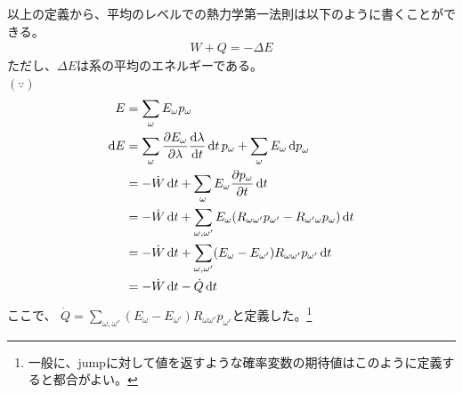 \documentclass[a4paper,11pt]{jsarticle}
\numberwithin{equation}{section}
\begin{document}
  以上の定義から、平均のレベルでの熱力学第一法則は以下のように書くことができる。
  \begin{align}
    W + Q = -\Delta E
  \end{align}
  ただし、$\Delta E$は系の平均のエネルギーである。\\
  $(\because)$\\
\begin{align}
  E &= \sum_{\omega} E_{\omega} p_{\omega}\\
  \dd{E} &= \sum_{\omega} \pdv{E_{\omega}}{\lambda} \dv{\lambda}{t} \dd{t} p_{\omega} + \sum_{\omega} E_{\omega} \dd{p}_{\omega}\\
  &= -\dot{W} \dd{t} + \sum_{\omega} E_{\omega} \pdv{p_{\omega}}{t} \dd{t}\\
  &= -\dot{W} \dd{t} + \sum_{\omega,\omega'} E_{\omega} (R_{\omega \omega'}p_{\omega'} - R_{\omega' \omega} p_{\omega}) \dd{t}\\
  &= -\dot{W} \dd{t} + \sum_{\omega,\omega'} (E_{\omega} - E_{\omega'}) R_{\omega \omega'} p_{\omega'} \dd{t}\\
  &= -\dot{W} \dd{t}  -\dot{Q} \dd{t} 
\end{align}
ここで、
$\dot{Q} = \sum_{\omega,\omega'} (E_{\omega} - E_{\omega'}) R_{\omega \omega'} p_{\omega'}$と定義した。\footnote
{一般に、jumpに対して値を返すような確率変数の期待値はこのように定義すると都合がよい。
}


  
\end{document}

